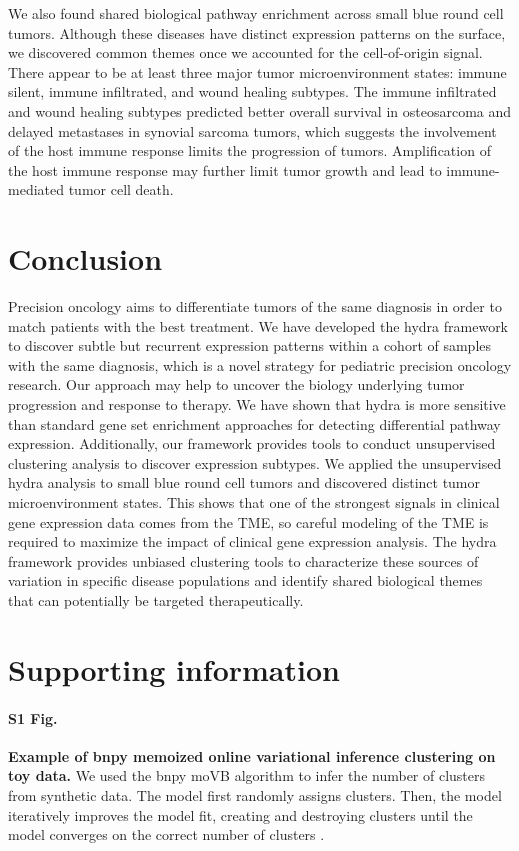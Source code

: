 \documentclass[10pt,letterpaper]{article}
\begin{document}
We also found shared biological pathway enrichment across small blue round cell tumors. Although these diseases have distinct expression patterns on the surface, we discovered common themes once we accounted for the cell-of-origin signal. There appear to be at least three major tumor microenvironment states: immune silent, immune infiltrated, and wound healing subtypes. The immune infiltrated and wound healing subtypes predicted better overall survival in osteosarcoma and delayed metastases in synovial sarcoma tumors, which suggests the involvement of the host immune response limits the progression of tumors. Amplification of the host immune response may further limit tumor growth and lead to immune-mediated tumor cell death. 

\section*{Conclusion}
Precision oncology aims to differentiate tumors of the same diagnosis in order to match patients with the best treatment. We have developed the hydra framework to discover subtle but recurrent expression patterns within a cohort of samples with the same diagnosis, which is a novel strategy for pediatric precision oncology research. Our approach may help to uncover the biology underlying tumor progression and response to therapy. We have shown that hydra is more sensitive than standard gene set enrichment approaches for detecting differential pathway expression. Additionally, our framework provides tools to conduct unsupervised clustering analysis to discover expression subtypes. We applied the unsupervised hydra analysis to small blue round cell tumors and discovered distinct tumor microenvironment states. This shows that one of the strongest signals in clinical gene expression data comes from the TME, so careful modeling of the TME is required to maximize the impact of clinical gene expression analysis. The hydra framework provides unbiased clustering tools to characterize these sources of variation in specific disease populations and identify shared biological themes that can potentially be targeted therapeutically.

\section*{Supporting information}

\paragraph*{S1 Fig.}
\label{S1_Fig}
{\bf Example of bnpy memoized online variational inference clustering on toy data.} We used the bnpy moVB algorithm to infer the number of clusters from synthetic data. The model first randomly assigns clusters. Then, the model iteratively improves the model fit, creating and destroying clusters until the model converges on the correct number of clusters \cite{hughesBnpyReliableScalable}. 
\end{document}
